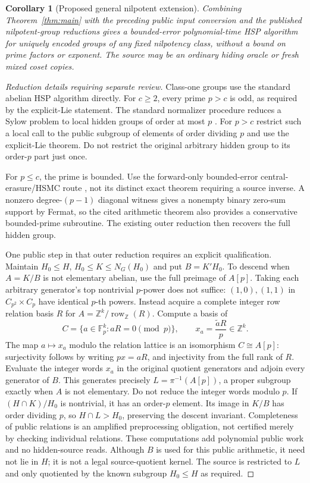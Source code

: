 \documentclass[11pt]{article}
\newtheorem{corollary}[theorem]{Corollary}
\theoremstyle{remark}
\begin{document}
\begin{corollary}[Proposed general nilpotent extension]
Combining Theorem~\ref{thm:main} with the preceding public input conversion
and the published nilpotent-group reductions gives a bounded-error
polynomial-time HSP algorithm for uniquely encoded groups of any fixed
nilpotency class, without a bound on prime factors or exponent. The source
may be an ordinary hiding oracle or fresh mixed coset copies.
\end{corollary}
\begin{proof}[Reduction details requiring separate review]
Class-one groups use the standard abelian HSP algorithm directly. For
$c\ge2$, every prime $p>c$ is odd, as required by the explicit-Lie statement.
The standard normalizer procedure reduces a Sylow problem to local hidden
groups of order at most $p$ \cite[Section 3]{iss}. For $p>c$ restrict such
a local call to the public subgroup of elements of order dividing $p$ and
use the explicit-Lie theorem. Do not restrict the original arbitrary hidden
group to its order-$p$ part just once.

For $p\le c$, the prime is bounded. Use the forward-only bounded-error
central-erasure/HSMC route \cite[Proposition 3]{ii}, not its distinct exact
theorem requiring a source inverse. A nonzero degree-$(p-1)$ diagonal
witness gives a nonempty binary zero-sum support by Fermat, so the cited
arithmetic theorem also provides a conservative bounded-prime subroutine.
The existing outer reduction then recovers the full hidden group.

One public step in that outer reduction requires an explicit qualification.
Maintain $H_0\le H$, $H_0\le K\le N_G(H_0)$ and put $B=K'H_0$.
To descend when $A=K/B$ is not elementary abelian, use the full preimage
of $A[p]$. Taking each arbitrary generator's top nontrivial $p$-power
does not suffice: $(1,0),(1,1)$ in $C_{p^2}\times C_p$ have identical
$p$-th powers. Instead acquire a complete integer row relation basis $R$
for $A=\mathbb Z^k/\operatorname{row}_{\mathbb Z}(R)$. Compute a basis of
\[
 C=\{a\in\mathbb F_p^k:aR=0\pmod p\},
 \qquad x_a=\frac{\widetilde a R}{p}\in\mathbb Z^k.
\]
The map $a\mapsto x_a$ modulo the relation lattice is an isomorphism
$C\cong A[p]$: surjectivity follows by writing $px=aR$, and injectivity
from the full rank of $R$. Evaluate the integer words $x_a$ in the
original quotient generators and adjoin every generator of $B$. This
generates precisely $L=\pi^{-1}(A[p])$, a proper subgroup exactly when
$A$ is not elementary. Do not reduce the integer words modulo $p$.
If $(H\cap K)/H_0$ is nontrivial, it has an order-$p$ element. Its image
in $K/B$ has order dividing $p$, so $H\cap L>H_0$, preserving the descent
invariant. Completeness of public relations is an amplified preprocessing
obligation, not certified merely by checking individual relations. These
computations add polynomial public work and no hidden-source reads.
Although $B$ is used for this public arithmetic, it need not lie in $H$;
it is not a legal source-quotient kernel. The source is restricted to $L$
and only quotiented by the known subgroup $H_0\le H$ as required.


\end{proof}
\end{document}

